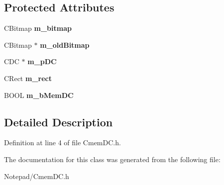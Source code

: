 \subsection*{Protected Attributes}
\begin{DoxyCompactItemize}
\item 
\mbox{\label{class_c_mem_d_c_a656d0829875d4441e5997ecf30dd8b9d}} 
C\+Bitmap {\bfseries m\+\_\+bitmap}
\item 
\mbox{\label{class_c_mem_d_c_ac4c0237868e1fc567a1e1d0d4828ea89}} 
C\+Bitmap $\ast$ {\bfseries m\+\_\+old\+Bitmap}
\item 
\mbox{\label{class_c_mem_d_c_ae013e30dc2cc3b542a443ca33e4b3a26}} 
C\+DC $\ast$ {\bfseries m\+\_\+p\+DC}
\item 
\mbox{\label{class_c_mem_d_c_a0c7ea48b0b35ab438380f4a7ffcabf36}} 
C\+Rect {\bfseries m\+\_\+rect}
\item 
\mbox{\label{class_c_mem_d_c_ac619120dae83fd18ab76e343a407a074}} 
B\+O\+OL {\bfseries m\+\_\+b\+Mem\+DC}
\end{DoxyCompactItemize}


\subsection{Detailed Description}


Definition at line 4 of file Cmem\+D\+C.\+h.



The documentation for this class was generated from the following file\+:\begin{DoxyCompactItemize}
\item 
Notepad/Cmem\+D\+C.\+h\end{DoxyCompactItemize}

